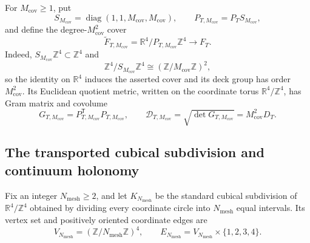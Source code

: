 For \(M_{\mathrm{cov}}\geq1\), put
\begin{equation}
 S_{M_{\mathrm{cov}}}
 =\operatorname{diag}(1,1,M_{\mathrm{cov}},M_{\mathrm{cov}}),
 \qquad
 P_{T,M_{\mathrm{cov}}}=P_TS_{M_{\mathrm{cov}}},
 \label{cusp-link-cover-matrix}
\end{equation}
and define the degree-\(M_{\mathrm{cov}}^2\) cover
\begin{equation}
 \widetilde F_{T,M_{\mathrm{cov}}}
 =\mathbb R^4/P_{T,M_{\mathrm{cov}}}\mathbb Z^4
 \longrightarrow F_T.
 \label{cusp-link-cover-torus}
\end{equation}
Indeed,
\(S_{M_{\mathrm{cov}}}\mathbb Z^4\subset\mathbb Z^4\) and
\[
 \mathbb Z^4/S_{M_{\mathrm{cov}}}\mathbb Z^4
 \cong(\mathbb Z/M_{\mathrm{cov}}\mathbb Z)^2,
\]
so the identity on \(\mathbb R^4\) induces the asserted cover and its deck
group has order \(M_{\mathrm{cov}}^2\).
Its Euclidean quotient metric, written on the coordinate torus
\(\mathbb R^4/\mathbb Z^4\), has Gram matrix and covolume
\begin{equation}
 G_{T,M_{\mathrm{cov}}}
 =P_{T,M_{\mathrm{cov}}}^{\mathsf T}P_{T,M_{\mathrm{cov}}},
 \qquad
 \mathcal D_{T,M_{\mathrm{cov}}}
 =\sqrt{\det G_{T,M_{\mathrm{cov}}}}
 =M_{\mathrm{cov}}^2D_T.
 \label{cusp-link-cover-metric}
\end{equation}

\subsection{The transported cubical subdivision and continuum holonomy}

Fix an integer \(N_{\mathrm{mesh}}\geq2\), and let
\(K_{N_{\mathrm{mesh}}}\) be the standard cubical subdivision of
\(\mathbb R^4/\mathbb Z^4\) obtained by dividing every coordinate circle
into \(N_{\mathrm{mesh}}\) equal intervals.  Its vertex set and positively
oriented coordinate edges are
\begin{equation}
 V_{N_{\mathrm{mesh}}}
 =(\mathbb Z/N_{\mathrm{mesh}}\mathbb Z)^4,
 \qquad
 E_{N_{\mathrm{mesh}}}
 =V_{N_{\mathrm{mesh}}}\times\{1,2,3,4\}.
 \label{cusp-link-cubical-sets}
\end{equation}

